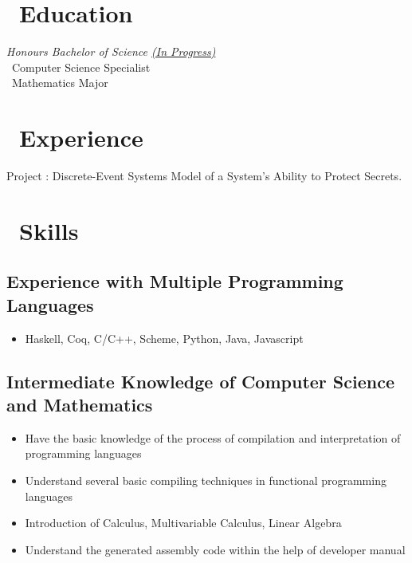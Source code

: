\documentclass{resume}
\begin{document}



\section{\faGraduationCap\ Education}
\textit{Honours Bachelor of Science \underline{(In Progress)}} 
\\ \textperiodcentered\  Computer Science Specialist 
\\ \textperiodcentered\  Mathematics Major

\section{\faUsers\ Experience}
 {}
Project : Discrete-Event Systems Model of a System's Ability to Protect Secrets.





\section{\faCogs\ Skills}
\subsection{\textbf{Experience with Multiple Programming Languages}}
\begin{itemize}
 \item Haskell, Coq, C/C++, Scheme, Python, Java, Javascript
\end{itemize}
\subsection{\textbf{Intermediate Knowledge of Computer Science and Mathematics}}
\begin{itemize}
\item Have the basic knowledge of the process of compilation and interpretation of programming languages
\item Understand several basic compiling techniques in functional programming languages
\item Introduction of Calculus, Multivariable Calculus, Linear Algebra
\item Understand the generated assembly code within the help of developer manual
\end{itemize}
\end{document}
